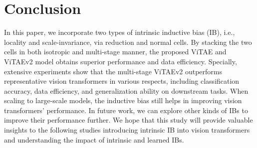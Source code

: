 \documentclass[twocolumn]{svjour3}          \smartqed  \usepackage{natbib}
\begin{document}
\section{Conclusion}
\label{sec:ViTAEconclud}

In this paper, we incorporate two types of intrinsic inductive bias (IB), i.e., locality and scale-invariance, via reduction and normal cells. By stacking the two cells in both isotropic and multi-stage manner, the proposed ViTAE and ViTAEv2 model obtains superior performance and data efficiency. Specially, extensive experiments show that the multi-stage ViTAEv2 outperforms representative vision transformers in various respects, including classification accuracy, data efficiency, and generalization ability on downstream tasks. When scaling to large-scale models, the inductive bias still helps in improving vision transformers' performance. In future work, we can explore other kinds of IBs to improve their performance further. We hope that this study will provide valuable insights to the following studies introducing intrinsic IB into vision transformers and understanding the impact of intrinsic and learned IBs.

{\small


}
\end{document}
